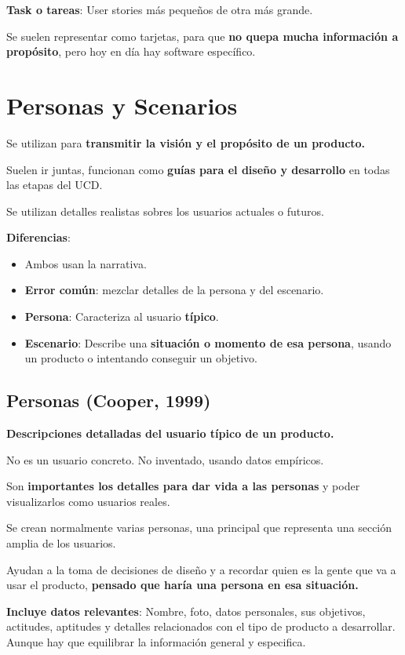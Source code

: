 \documentclass[12pt]{report} %
\begin{document}
\textbf{Task o tareas}: User stories más pequeños de otra más grande.

Se suelen representar como tarjetas, para que \textbf{no quepa mucha
información a propósito}, pero hoy en día hay software específico.

\section{Personas y Scenarios}

Se utilizan para \textbf{transmitir la visión y el propósito de un
producto.}

Suelen ir juntas, funcionan como \textbf{guías para el diseño y
desarrollo} en todas las etapas del UCD.

Se utilizan detalles realistas sobres los usuarios actuales o futuros.

\textbf{Diferencias}:

\begin{itemize}

\item
  Ambos usan la narrativa.
\item
  \textbf{Error común}: mezclar detalles de la persona y del escenario.
\item
  \textbf{Persona}: Caracteriza al usuario \textbf{típico}.
\item
  \textbf{Escenario}: Describe una \textbf{situación o momento de esa
  persona}, usando un producto o intentando conseguir un objetivo.
\end{itemize}

\subsection{Personas (Cooper, 1999)}

\textbf{Descripciones detalladas del usuario típico de un producto.}

No es un usuario concreto. No inventado, usando datos empíricos.

Son \textbf{importantes los detalles para dar vida a las personas} y
poder visualizarlos como usuarios reales.

Se crean normalmente varias personas, una principal que representa una
sección amplia de los usuarios.

Ayudan a la toma de decisiones de diseño y a recordar quien es la gente
que va a usar el producto, \textbf{pensado que haría una persona en esa
situación.}

\textbf{Incluye datos relevantes}: Nombre, foto, datos personales, sus
objetivos, actitudes, aptitudes y detalles relacionados con el tipo de
producto a desarrollar. Aunque hay que equilibrar la información general
y especifica.
\end{document}
